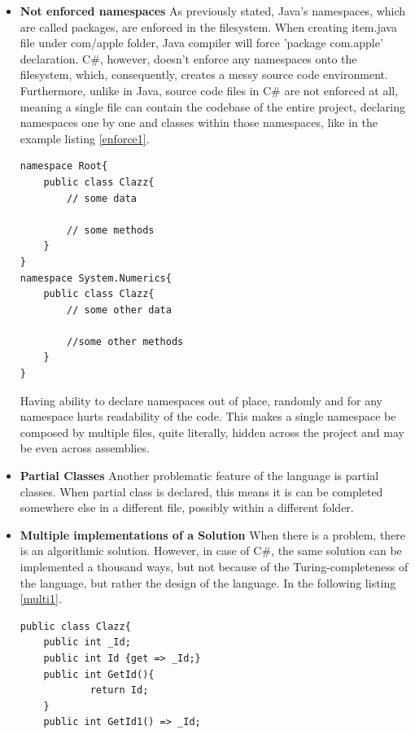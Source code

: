 \documentclass{article}
\begin{document}
\begin{itemize}
    \item \textbf{Not enforced namespaces} \newline
          As previously stated, Java's namespaces, which are called packages, are enforced in the filesystem. When creating item.java file under com/apple folder, Java compiler will force 'package com.apple' declaration.
          C\#, however, doesn't enforce any namespaces onto the filesystem, which, consequently, creates a messy source code environment. Furthermore, unlike in Java, source code files in C\# are not enforced at all, meaning a single file can contain the codebase of the entire project, declaring namespaces one by one and classes within those namespaces, like in the example listing \ref*{enforce1}.
          \newpage
          \begin{lstlisting}[frame=single, label=enforce1, caption=Example File thisisok.cs]
namespace Root{
    public class Clazz{
        // some data

        // some methods
    }
}
namespace System.Numerics{
    public class Clazz{
        // some other data

        //some other methods
    }
}
            \end{lstlisting}
            Having ability to declare namespaces out of place, randomly and for any namespace hurts readability of the code. This makes a single namespace be composed by multiple files, quite literally, hidden across the project and may be even across assemblies.
    \item \textbf{Partial Classes} \newline
          Another problematic feature of the language is partial classes. When partial class is declared, this means it is can be completed somewhere else in a different file, possibly within a different folder. 
    \item \textbf{Multiple implementations of a Solution} \newline
          When there is a problem, there is an algorithmic solution. However, in case of C\#, the same solution can be implemented a thousand ways, but not because of the Turing-completeness of the language, but rather the design of the language. In the following listing \ref*{multi1}.
          \begin{lstlisting}[frame=single, label=multi1, caption=Example C\# File notok.cs]
public class Clazz{
    public int _Id;
    public int Id {get => _Id;}
    public int GetId(){
            return Id;
    }
    public int GetId1() => _Id;


\end{lstlisting}
\end{itemize}
\end{document}
